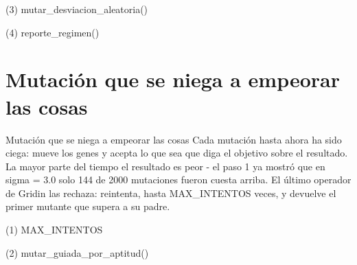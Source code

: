 \begin{frame}[fragile]{(3) mutar\_desviacion\_aleatoria()}

\end{frame}

\begin{frame}[fragile]{(4) reporte\_regimen()}

\end{frame}


\section{Mutación que se niega a empeorar las cosas}

\begin{frame}{Mutación que se niega a empeorar las cosas}
Cada mutación hasta ahora ha sido ciega: mueve los genes y acepta lo que sea que
diga el objetivo sobre el resultado. La mayor parte del tiempo el resultado es peor -
el paso 1 ya mostró que en sigma = 3.0 solo 144 de 2000 mutaciones fueron
cuesta arriba. El último operador de Gridin las rechaza: reintenta, hasta MAX\_INTENTOS
veces, y devuelve el primer mutante que supera a su padre.
\end{frame}

\begin{frame}[fragile]{(1) MAX\_INTENTOS}

\end{frame}

\begin{frame}[fragile]{(2) mutar\_guiada\_por\_aptitud()}

\end{frame}

